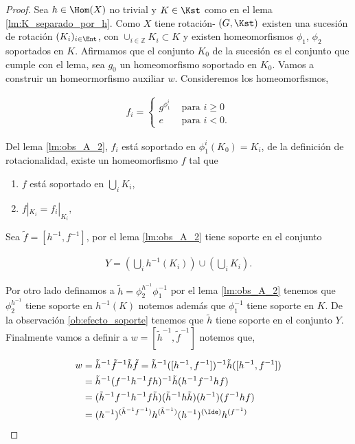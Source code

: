 \begin{proof}
Sea $h \in \Hom(X)$ no trivial y $K \in \Kst$ como en el lema \ref{lm:K_separado_por_h}. Como $X$ tiene rotación- $(G, \Kst)$ existen una sucesión de rotación $(K_i)_{i \in \Ent}$, con $\cup_{i \in \mathbb{Z}} K_i \subset K$ y existen homeomorfismos $\phi_1$, $\phi_2$ soportados en $K$. Afirmamos que el conjunto $K_0$ de la sucesión es el conjunto que cumple con el lema, sea $g_0$ un homeomorfismo soportado en $K_0$. Vamos a construir un homeormorfismo auxiliar $w$. Consideremos los homeomorfismos, 

\begin{align*}
f_i= \begin{cases} 
g^{\phi_1^i} & \text{ para } i \geq 0 \\
e & \text{ para } i <0. 
\end{cases}
\end{align*}

Del lema \ref{lm:obs_A_2}, $f_i$ está soportado en $\phi_1^i(K_0)=K_i$, de la definición de rotacionalidad, existe un homeomorfismo $f$ tal que

\begin{enumerate}
	\item $f$ está soportado en $\bigcup_i K_i$,
	\item $f |_{K_i}=f_i|_{K_i},$
\end{enumerate}

Sea $\tilde{f}=[h^{-1},f^{-1}]$,  por el lema \ref{lm:obs_A_2} tiene soporte en el conjunto

\begin{align*}
 Y= \left(\bigcup_i h^{-1}(K_i) \right)\cup \left(\bigcup_i K_i \right).
\end{align*}

Por otro lado definamos a $\tilde{h}=\phi_2^{h^{-1}}\phi_1^{-1}$ por el lema \ref{lm:obs_A_2} tenemos que $\phi_2^{h^{-1}}$ tiene soporte en $h^{-1}(K)$ notemos además que $\phi_1^{-1}$ tiene soporte en $K$. De la observación \ref{ob:efecto_soporte} tenemos que $\tilde{h}$ tiene soporte en el conjunto $Y.$ Finalmente vamos a definir a $w = [\tilde{h}^{-1},\tilde{f}^{-1}]$ notemos que,

\begin{align*}
w &  =\tilde{h}^{-1}\tilde{f}^{-1}\tilde{h}\tilde{f} =\tilde{h}^{-1}([h^{-1},f^{-1}])^{-1}\tilde{h}([h^{-1},f^{-1}]) \\
& = \tilde{h}^{-1} (f^{-1}h^{-1}fh)^{-1}\tilde{h}(h^{-1}f^{-1}hf)\\
& = (\tilde{h}^{-1} f^{-1}h^{-1}f \tilde{h})(\tilde{h}^{-1} h\tilde{h})(h^{-1})(f^{-1}hf)\\
& = (h^{-1})^{(\tilde{h}^{-1} f^{-1})}h^{(\tilde{h}^{-1})}(h^{-1})^{(\Ide)}h^{(f^{-1})}
\end{align*}



\end{proof}
